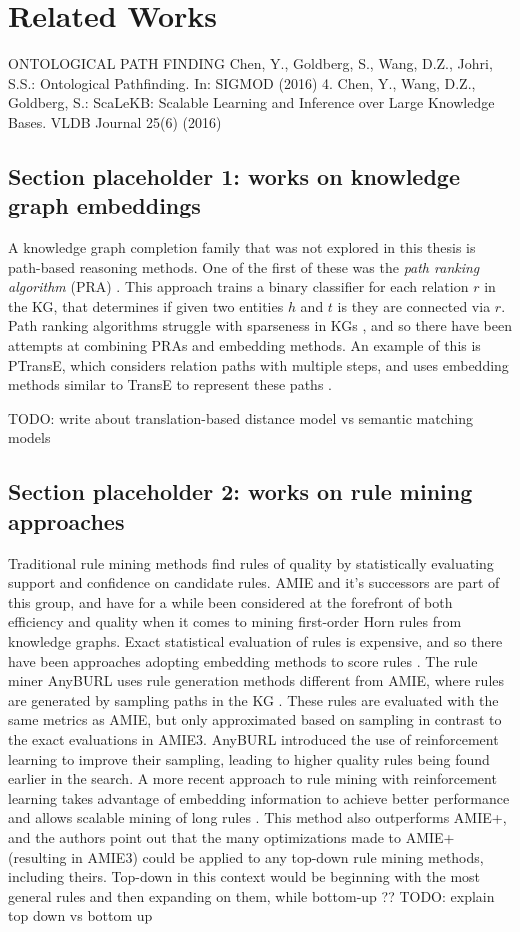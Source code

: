 \chapter{Related Works}

ONTOLOGICAL PATH FINDING
Chen, Y., Goldberg, S., Wang, D.Z., Johri, S.S.: Ontological Pathfinding. In: SIGMOD (2016) 
4. Chen, Y., Wang, D.Z., Goldberg, S.: ScaLeKB: Scalable Learning and Inference over Large Knowledge Bases. VLDB Journal 25(6) (2016)

\section{Section placeholder 1: works on knowledge graph embeddings}
A knowledge graph completion family that was not explored in this thesis is path-based reasoning methods. One of the first of these was the \textit{path ranking algorithm} (PRA) \cite{lao2011random}. This approach trains a binary classifier for each relation $r$ in the KG, that determines if given two entities $h$ and $t$ is they are connected via $r$. Path ranking algorithms struggle with sparseness in KGs \cite{ma2019elpkg}, and so there have been attempts at combining PRAs and embedding methods. An example of this is PTransE, which considers relation paths with multiple steps, and uses embedding methods similar to TransE to represent these paths \cite{lin2015modeling}. 

TODO: write about translation-based distance model vs semantic matching models

\section{Section placeholder 2: works on rule mining approaches}
Traditional rule mining methods find rules of quality by statistically evaluating support and confidence on candidate rules. AMIE and it's successors are part of this group, and have for a while been considered at the forefront of both efficiency and quality when it comes to mining first-order Horn rules from knowledge graphs. Exact statistical evaluation of rules is expensive, and so there have been approaches adopting embedding methods to score rules \cite{yang2014embedding, omran2018scalable, omran2019embedding}. The rule miner AnyBURL uses rule generation methods different from AMIE, where rules are generated by sampling paths in the KG \cite{meilicke2020reinforced}. These rules are evaluated with the same metrics as AMIE, but only approximated based on sampling in contrast to the exact evaluations in AMIE3. AnyBURL introduced the use of reinforcement learning to improve their sampling, leading to higher quality rules being found earlier in the search. A more recent approach to rule mining with reinforcement learning takes advantage of embedding information to achieve better performance and allows scalable mining of long rules \cite{chen2022rule}. This method also outperforms AMIE+, and the authors point out that the many optimizations made to AMIE+ (resulting in AMIE3) could be applied to any top-down rule mining methods, including theirs. Top-down in this context would be beginning with the most general rules and then expanding on them, while bottom-up ??
TODO: explain top down vs bottom up

